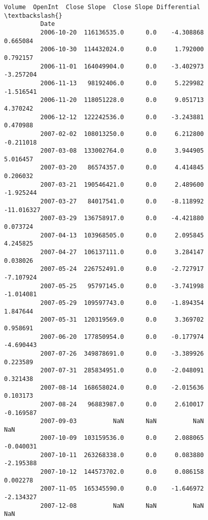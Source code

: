 \documentclass[11pt]{article}
\begin{document}
\begin{Verbatim}[commandchars=\\\{\}]
                           Volume  OpenInt  Close Slope  Close Slope Differential  \textbackslash{}
          Date                                                                      
          2006-10-20  116136535.0      0.0    -4.308868                  0.665084   
          2006-10-30  114432024.0      0.0     1.792000                  0.792157   
          2006-11-01  164049904.0      0.0    -3.402973                 -3.257204   
          2006-11-13   98192406.0      0.0     5.229982                 -1.516541   
          2006-11-20  118051228.0      0.0     9.051713                  4.370242   
          2006-12-12  122242536.0      0.0    -3.243881                  0.470988   
          2007-02-02  108013250.0      0.0     6.212800                 -0.211018   
          2007-03-08  133002764.0      0.0     3.944905                  5.016457   
          2007-03-20   86574357.0      0.0     4.414845                  0.206032   
          2007-03-21  190546421.0      0.0     2.489600                 -1.925244   
          2007-03-27   84017541.0      0.0    -8.118992                -11.016327   
          2007-03-29  136758917.0      0.0    -4.421880                  0.073724   
          2007-04-13  103968505.0      0.0     2.095845                  4.245825   
          2007-04-27  106137111.0      0.0     3.284147                  0.038026   
          2007-05-24  226752491.0      0.0    -2.727917                 -7.107924   
          2007-05-25   95797145.0      0.0    -3.741998                 -1.014081   
          2007-05-29  109597743.0      0.0    -1.894354                  1.847644   
          2007-05-31  120319569.0      0.0     3.369702                  0.958691   
          2007-06-20  177850954.0      0.0    -0.177974                 -4.690443   
          2007-07-26  349878691.0      0.0    -3.389926                  0.223589   
          2007-07-31  285834951.0      0.0    -2.048091                  0.321438   
          2007-08-14  168658024.0      0.0    -2.015636                  0.103173   
          2007-08-24   96883987.0      0.0     2.610017                 -0.169587   
          2007-09-03          NaN      NaN          NaN                       NaN   
          2007-10-09  103159536.0      0.0     2.088065                 -0.040031   
          2007-10-11  263268338.0      0.0     0.083880                 -2.195388   
          2007-10-12  144573702.0      0.0     0.086158                  0.002278   
          2007-11-05  165345590.0      0.0    -1.646972                 -2.134327   
          2007-12-08          NaN      NaN          NaN                       NaN   

\end{Verbatim}
\end{document}

